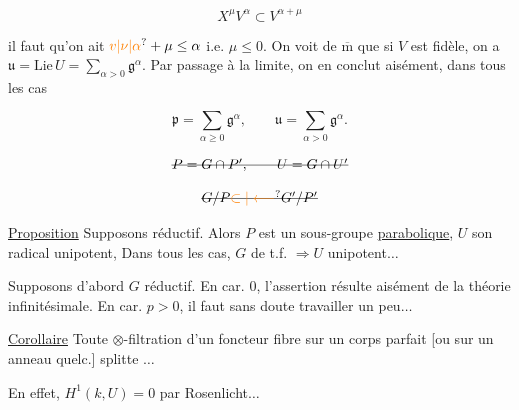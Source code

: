 \[
X^\mu V^\alpha\subset V^{\alpha+\mu}
\]

il faut qu'on ait $\unsure{v|\nu|\alpha}+\mu\leq\alpha$ i.e. $\mu\leq0$. On voit de $\overline{\mathrm m}$ que si $V$ est fidèle, on a $\mathfrak u=\mathrm{Lie}\,U=\sum_{\alpha>0}\mathfrak g^\alpha$. Par passage à la limite, on en conclut aisément, dans tous les cas

\[
\mathfrak p=\sum_{\alpha\geq0}\mathfrak g^\alpha,\qquad \mathfrak u=\sum_{\alpha>0}\mathfrak g^\alpha.
\]



\[
\deleted{P=G\cap P',\qquad U=G\cap U'}
\]


\[
\deleted{G/P\unsure{\subset|\longleftarrow}G'/P'}
\]

\uline{Proposition} Supposons   réductif. Alors $P$ est un sous-groupe \uline{parabolique},  $U$ son radical unipotent,  Dans tous les cas, $G$  de t.f. $\Longrightarrow U$ unipotent$\ldots$


Supposons d'abord $G$ réductif. En car. $0$, l'assertion résulte aisément de la théorie infinitésimale. En car. $p>0$,  il faut sans doute travailler un peu$\ldots$

\uline{Corollaire} Toute $\otimes$-filtration d'un foncteur fibre sur un corps parfait [ou sur un anneau quelc.] splitte $\ldots$


En effet, $H^1(k,U)=0$ par Rosenlicht$\ldots$

